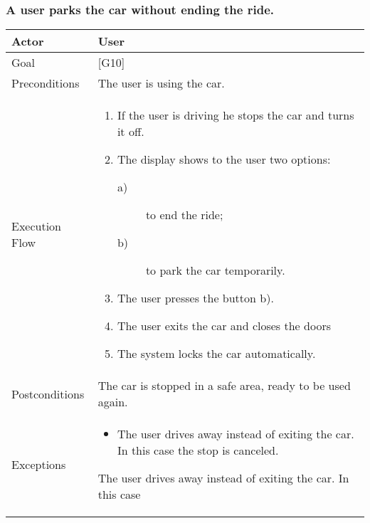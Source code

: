 \documentclass{article}
\begin{document}
	\subsubsection{A user parks the car without ending the ride.}
	\begin{tabularx}{\textwidth}{  l  X  }
		\hline
		Actor & User\\
		\hline
		Goal & [G10]\\
		\hline
		Preconditions & The user is using the car.\\
		\hline
		Execution Flow & \begin{enumerate}
			\item{If the user is driving he stops the car and turns it off.}
										 \item{The display shows to the user two options:
										 \begin{description}
										 					\item[a)]{ to end the ride;}
															\item[b)]{ to park the car temporarily.}
						\end{description}}
		 \item{The user presses the button b).}
		 \item{The user exits the car and closes the doors}
     \item{The system locks the car automatically.}
						\end{enumerate}\\
		\hline
		Postconditions & The car is stopped in a safe area, ready to be used again.\\
		\hline
		Exceptions & \begin{itemize}
			\item{The user drives away instead of exiting the car. In this case the stop is canceled.}
		\end{itemize}The user drives away instead of exiting the car. In this case\\
		\hline
	\end{tabularx}
\end{document}
